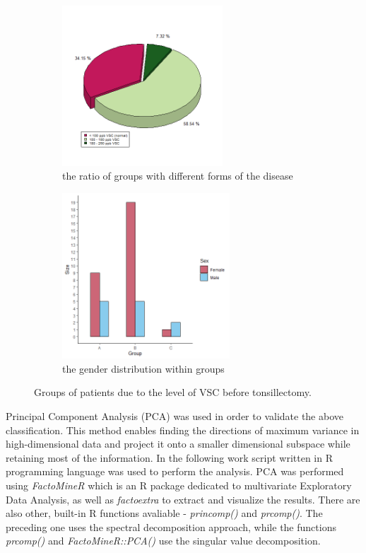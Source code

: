 \documentclass[12pt,a4paper,notitlepage]{report}
\begin{document}
\begin{figure}[h]
 
\begin{subfigure}{0.5\textwidth}
\includegraphics[width=1\linewidth, height=6cm]{./Figures/Fig_2.1a} 
\caption{the ratio of groups with different forms of the disease}
\label{Fig_2.1a}
\end{subfigure}
\begin{subfigure}{0.5\textwidth}
\includegraphics[width=1.1\linewidth, height=6.2cm]{./Figures/Fig_2.1b}
\caption{the gender distribution within groups}
\label{Fig_2.1b}
\end{subfigure}
 
\caption{Groups of patients due to the level of VSC before tonsillectomy.}
\label{Fig_2.1}
\end{figure}


Principal Component Analysis (PCA) was used in order to validate the above classification. This method enables finding the directions of maximum variance in high-dimensional data and project it onto a smaller dimensional subspace while retaining most of the information. In the following work script written in R programming language was used to perform the analysis. PCA was performed using \textit{FactoMineR} which is an R package dedicated to multivariate Exploratory Data Analysis, as well as \textit{factoextra} to extract and visualize the results. There are also other, built-in R functions avaliable - \textit{princomp()} and \textit{prcomp()}. The preceding one uses the spectral decomposition approach, while the functions \textit{prcomp()} and  \textit{FactoMineR::PCA()} use the singular value decomposition.
\end{document}
